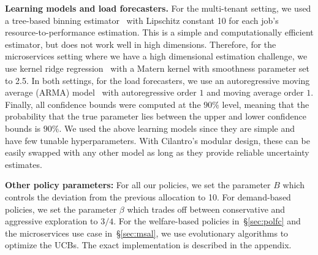 \textbf{Learning models and load forecasters.}
For the multi-tenant setting, we used a tree-based binning
estimator~\cite{kandasamy20online,bubeck2010x,grill2015black} with Lipschitz
constant 10 for each job's resource-to-performance estimation.
This is a simple and computationally efficient estimator, but does not work well in high dimensions.
Therefore, for the microservices setting where
we have a high dimensional estimation challenge,
we use
kernel ridge regression~\cite{zhang2013divide,welling2013kernel} with a Matern kernel with
smoothness parameter set to 2.5.
In both settings, for the load forecasters,
 we use an autoregressive moving average (ARMA) model~\cite{makridakis1997arma}
with autoregressive order $1$ and moving average order $1$.
Finally, all confidence bounds were computed at the $90\%$ level, meaning that the
probability that the true parameter lies between the upper and lower confidence bounds is $90\%$.
We used the above learning models since they are simple and
have few tunable hyperparameters.
With Cilantro's modular design, these can be easily swapped with any other 
model as long as they provide reliable uncertainty estimates.


\textbf{Other policy parameters:}
For all our policies, we set the parameter $B$ which controls the deviation from the previous
allocation to 10.
For demand-based policies, we set the parameter $\beta$ which trades off between conservative and
aggressive exploration to $3/4$.
For the welfare-based policies in~\S\ref{sec:polfc} and the microservices use case
in~\S\ref{sec:msal}, we use evolutionary algorithms to optimize the UCBs.
The exact implementation is described in the appendix.


